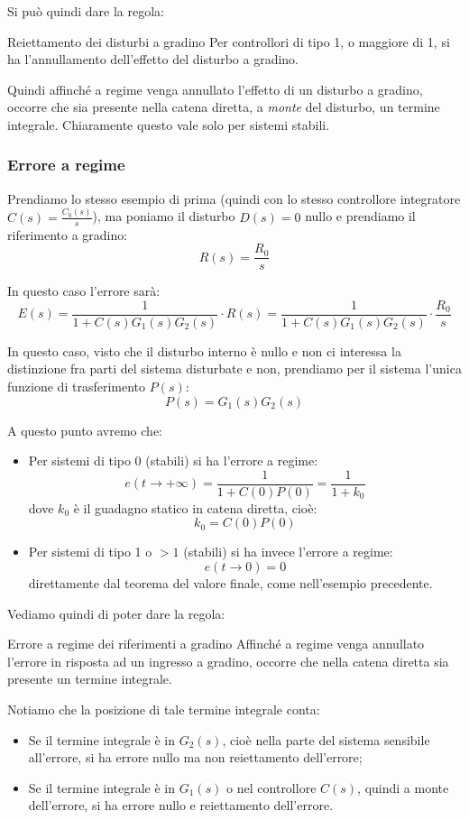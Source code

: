 \documentclass[a4paper,11pt]{article}
\begin{document}
Si può quindi dare la regola:
\begin{theorem}{Reiettamento dei disturbi a gradino}
	Per controllori di tipo 1, o maggiore di 1, si ha l'annullamento dell'effetto del disturbo a gradino.
\end{theorem}

Quindi affinché a regime venga annullato l'effetto di un disturbo a gradino, occorre che sia presente nella catena diretta, a \textit{monte} del disturbo, un termine integrale.
Chiaramente questo vale solo per sistemi stabili.

\subsubsection{Errore a regime}
Prendiamo lo stesso esempio di prima (quindi con lo stesso controllore integratore $C(s) = \frac{C_0(s)}{s}$), ma poniamo il disturbo $D(s) = 0$ nullo e prendiamo il riferimento a gradino:
$$
R(s) = \frac{R_0}{s}
$$

In questo caso l'errore sarà:
$$
E(s) = \frac{1}{1 + C(s) G_1(s) G_2(s)} \cdot R(s) = \frac{1}{1 + C(s) G_1(s) G_2(s)} \cdot \frac{R_0}{s}
$$

In questo caso, visto che il disturbo interno è nullo e non ci interessa la distinzione fra parti del sistema disturbate e non, prendiamo per il sistema l'unica funzione di trasferimento $P(s)$:
$$
P(s) = G_1(s) G_2(s)
$$

A questo punto avremo che:
\begin{itemize}
	\item Per sistemi di tipo 0 (stabili) si ha l'errore a regime:
		$$
		e(t \rightarrow +\infty) = \frac{1}{1 + C(0) P(0)} = \frac{1}{1 + k_0}
		$$
		dove $k_0$ è il guadagno statico in catena diretta, cioè:
		$$
		k_0 = C(0) P(0)
		$$
	\item Per sistemi di tipo 1 o $> 1$ (stabili) si ha invece l'errore a regime:
		$$
		e(t \rightarrow 0) = 0
		$$
		direttamente dal teorema del valore finale, come nell'esempio precedente.
\end{itemize}

Vediamo quindi di poter dare la regola:
\begin{theorem}{Errore a regime dei riferimenti a gradino}
	Affinché a regime venga annullato l'errore in risposta ad un ingresso a gradino, occorre che nella catena diretta sia presente un termine integrale.
\end{theorem}

Notiamo che la posizione di tale termine integrale conta:
\begin{itemize}
	\item Se il termine integrale è in $G_2(s)$, cioè nella parte del sistema sensibile all'errore, si ha errore nullo ma non reiettamento dell'errore;
	\item Se il termine integrale è in $G_1(s)$ o nel controllore $C(s)$, quindi a monte dell'errore, si ha errore nullo e reiettamento dell'errore. 
\end{itemize}
\end{document}
